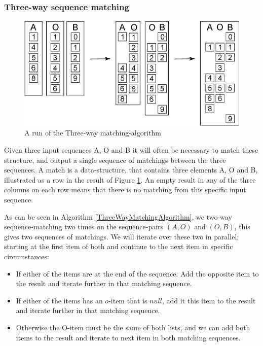 \documentclass[11pt]{article}
\begin{document}
\subsubsection{Three-way sequence matching}
\begin{figure}
   \centerline{\includegraphics[scale=0.6]{drawings/eps/threewaymatching.eps}}
   \caption{A run of the Three-way matching-algorithm}
   \label{ThreewayMatching}
\end{figure}

Given three input sequences A, O and B it will often be necessary to match these structure, and output a single sequence of matchings between the three sequences. A match is a data-structure, that contains three elements A, O and B, illustrated as a row in the result of Figure \ref{ThreewayMatching}. An empty result in any of the three columns on each row means that there is no matching from this specific input sequence.

As can be seen in Algorithm \ref{ThreeWayMatchingAlgorithm}, we two-way sequence-matching two times on the sequence-pairs $(A, O)$ and $(O, B)$, this gives two sequences of matchings.  We will iterate over these two in parallel; starting at the first item of both and continue to the next item in specific circumstances:

\begin{itemize}
	\item If either of the items are at the end of the sequence. Add the opposite item to the result and iterate further in that matching sequence.
	\item If either of the items has an $o$-item that is $null$, add it this item to the result and iterate further in that matching sequence.
	\item Otherwise the O-item must be the same of both lists, and we can add both items to the result and iterate to next item in both matching sequences.
\end{itemize}
\end{document}
